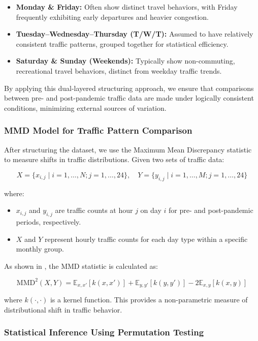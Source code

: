 \documentclass{article}
\begin{document}
\begin{itemize}
    \item \textbf{Monday \& Friday:} Often show distinct travel behaviors, with Friday frequently exhibiting early departures and heavier congestion.
    \item \textbf{Tuesday–Wednesday–Thursday (T/W/T):} Assumed to have relatively consistent traffic patterns, grouped together for statistical efficiency.
    \item \textbf{Saturday \& Sunday (Weekends):} Typically show non-commuting, recreational travel behaviors, distinct from weekday traffic trends.
\end{itemize}

By applying this dual-layered structuring approach, we ensure that comparisons between pre- and post-pandemic traffic data are made under logically consistent conditions, minimizing external sources of variation.

\subsubsection{MMD Model for Traffic Pattern Comparison}

After structuring the dataset, we use the Maximum Mean Discrepancy statistic to measure shifts in traffic distributions. Given two sets of traffic data:

\[
X = \{x_{i,j} \mid i = 1, \dots, N; j = 1, \dots, 24\}, \quad Y = \{y_{i,j} \mid i = 1, \dots, M; j = 1, \dots, 24\}
\]

where:

\begin{itemize}
    \item $x_{i,j}$ and $y_{i,j}$ are traffic counts at hour $j$ on day $i$ for pre- and post-pandemic periods, respectively.
    \item $X$ and $Y$ represent hourly traffic counts for each day type within a specific monthly group.
\end{itemize}

As shown in \citet{Gretton2019}, the MMD statistic is calculated as:

\[
\text{MMD}^2(X, Y) = \mathbb{E}_{x,x'}[k(x, x')] + \mathbb{E}_{y,y'}[k(y, y')] - 2\mathbb{E}_{x,y}[k(x, y)]
\]

where \( k(\cdot, \cdot) \) is a kernel function. This provides a non-parametric measure of distributional shift in traffic behavior.

\subsubsection{Statistical Inference Using Permutation Testing}
\end{document}
